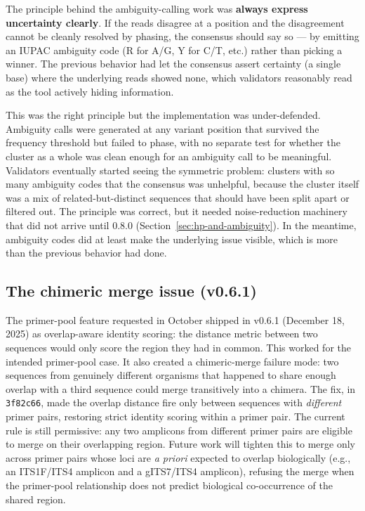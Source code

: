 \documentclass[11pt]{article}
\begin{document}
The principle behind the ambiguity-calling work was \textbf{always express
uncertainty clearly}. If the reads disagree at a position and the disagreement
cannot be cleanly resolved by phasing, the consensus should say so --- by
emitting an IUPAC ambiguity code (R for A/G, Y for C/T, etc.) rather than
picking a winner. The previous behavior had let the consensus assert certainty
(a single base) where the underlying reads showed none, which validators
reasonably read as the tool actively hiding information.

This was the right principle but the implementation was under-defended.
Ambiguity calls were generated at any variant position that survived the
frequency threshold but failed to phase, with no separate test for whether the
cluster as a whole was clean enough for an ambiguity call to be meaningful.
Validators eventually started seeing the symmetric problem: clusters with so
many ambiguity codes that the consensus was unhelpful, because the cluster
itself was a mix of related-but-distinct sequences that should have been
split apart or filtered out. The principle was correct, but it needed
noise-reduction machinery that did not arrive until 0.8.0
(Section~\ref{sec:hp-and-ambiguity}). In the meantime, ambiguity codes did at
least make the underlying issue visible, which is more than the previous
behavior had done.

\subsection{The chimeric merge issue (v0.6.1)}
\label{sec:chimeric}

The primer-pool feature requested in October shipped in v0.6.1 (December 18,
2025) as overlap-aware identity scoring: the distance metric between two
sequences would only score the region they had in common. This worked for the
intended primer-pool case. It also created a chimeric-merge failure mode:
two sequences from genuinely different organisms that happened to share enough
overlap with a third sequence could merge transitively into a chimera. The
fix, in \texttt{3f82c66}, made the overlap distance fire only between
sequences with \emph{different} primer pairs, restoring strict identity
scoring within a primer pair. The current rule is still permissive: any two
amplicons from different primer pairs are eligible to merge on their
overlapping region. Future work will tighten this to merge only across
primer pairs whose loci are \emph{a priori} expected to overlap biologically
(e.g., an ITS1F/ITS4 amplicon and a gITS7/ITS4 amplicon), refusing the merge
when the primer-pool relationship does not predict biological co-occurrence
of the shared region.
\end{document}
